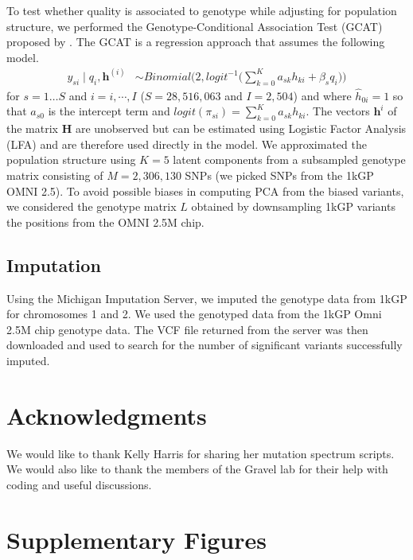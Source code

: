 \documentclass[9pt,lineno]{template}
\begin{document}
To test whether quality is associated to genotype while adjusting for population structure, we performed the Genotype-Conditional Association Test  (GCAT) proposed by \citep{song2015testing}.
The GCAT is a regression approach that assumes the following model.
\begin{align}\label{gcat}
 y_{si} \mid q_i, \boldsymbol{h}^{(i)} &\sim Binomial\bigg( 2, logit^{-1}\Big( \sum_{k=0}^{K} a_{sk} h_{ki} + \beta_s q_i\Big) \bigg)
\end{align} 
for $s=1\hdots S$ and $i=i,\cdots, I$  ($S = 28,516,063$ and $I = 2,504$) and where $\hat{h}_{0i}=1$ so that $a_{s0}$ is the intercept term and $logit(\pi_{si})=\sum_{k=0}^{K} a_{sk} h_{ki}$. 
The vectors $\boldsymbol{h}^{i}$ of the matrix $\mathbf{H}$ are unobserved but can be estimated using Logistic Factor Analysis (LFA) \citep{song2015testing} and are therefore used directly in the model. 
We approximated the population structure using $K=5$ latent components from a subsampled genotype matrix consisting of $M = 2,306,130$ SNPs (we picked SNPs from the 1kGP OMNI 2.5). 
To avoid possible biases in computing PCA from the biased variants, we considered the genotype matrix $L$ obtained by downsampling 1kGP variants the positions from the OMNI 2.5M chip.

\subsection{Imputation}
Using the Michigan Imputation Server, we imputed the genotype data from 1kGP for chromosomes 1 and 2.
We used the genotyped data from the 1kGP Omni 2.5M chip genotype data.
The VCF file returned from the server was then downloaded and used to search for the number of significant variants successfully imputed. 

\section{Acknowledgments}
We would like to thank Kelly Harris for sharing her mutation spectrum scripts.
We would also like to thank the members of the Gravel lab for their help with coding and useful discussions.



\clearpage
\section{Supplementary Figures}

\renewcommand{\thefigure}{S\arabic{figure}}
\setcounter{figure}{0}   	
\end{document}
